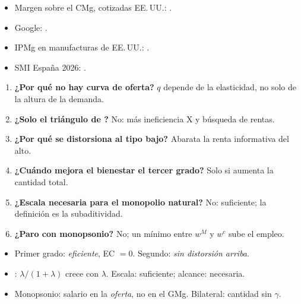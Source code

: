 \documentclass{article}
\begin{document}
\begin{columnas}
\anexorepaso
{}
\begin{itemize}
\item Margen sobre el CMg, cotizadas EE.\,UU.: .
\item Google: .
\item IPMg en manufacturas de EE.\,UU.: .
\item SMI España 2026: .
\end{itemize}
\begin{enumerate}
\item \textbf{¿Por qué no hay curva de oferta?} $q$ depende de la elasticidad, no solo de la altura de la demanda.
\item \textbf{¿Solo el triángulo de ?} No: más ineficiencia X y búsqueda de rentas.
\item \textbf{¿Por qué se distorsiona al tipo bajo?} Abarata la renta informativa del alto.
\item \textbf{¿Cuándo mejora el bienestar el tercer grado?} Solo si aumenta la cantidad total.
\item \textbf{¿Escala necesaria para el monopolio natural?} No: suficiente; la definición es la subaditividad.
\item \textbf{¿Paro con monopsonio?} No; un mínimo entre $w^M$ y $w^c$ sube el empleo.
\end{enumerate}
\begin{trampa}
\begin{itemize}
\item Primer grado: \emph{eficiente}, EC $=0$. Segundo: \emph{sin distorsión arriba}.
\item {}: $\lambda/(1+\lambda)$ crece con $\lambda$. Escala: suficiente; alcance: necesaria.
\item Monopsonio: salario en la \emph{oferta}, no en el GMg. Bilateral: cantidad sin $\gamma$.
\end{itemize}
\end{trampa}

\end{columnas}
\end{document}
